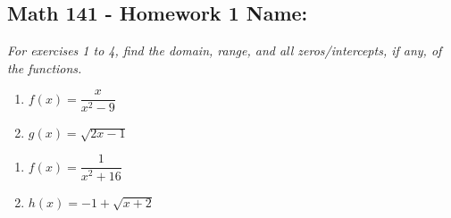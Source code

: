 \documentclass[11pt]{article}
\begin{document}
\pagestyle{empty}
\subsection*{Math 141 - Homework 1 \hfill Name: \underline{\hspace*{2in}}}
\textit{For exercises 1 to 4, find the domain, range, and all zeros/intercepts, if any, of the functions.} 

\begin{multicols}{2}
\begin{enumerate}
\item $f(x) = \dfrac{x}{x^2-9}$
\item $g(x) = \sqrt{2x-1}$
\setcounter{enumCount}{\theenumi}
\end{enumerate}
\end{multicols}
\vfill


\begin{multicols}{2}
\begin{enumerate}
\setcounter{enumi}{\theenumCount}
\item $f(x) = \dfrac{1}{x^2 + 16}$
\item $h(x) = -1 + \sqrt{x+2}$
\setcounter{enumCount}{\theenumi}
\end{enumerate}
\end{multicols}
\vfill
\end{document}
